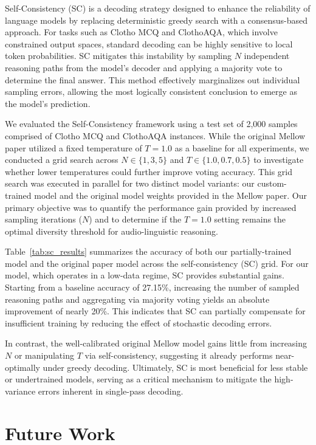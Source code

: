 \documentclass[cameraready]{Interspeech}
\begin{document}
Self-Consistency (SC) is a decoding strategy designed to enhance the reliability of language models by replacing deterministic greedy search with a consensus-based approach. For tasks such as Clotho MCQ and ClothoAQA, which involve constrained output spaces, standard decoding can be highly sensitive to local token probabilities. SC mitigates this instability by sampling $N$ independent reasoning paths from the model's decoder and applying a majority vote to determine the final answer. This method effectively marginalizes out individual sampling errors, allowing the most logically consistent conclusion to emerge as the model's prediction.

We evaluated the Self-Consistency framework using a test set of 2,000 samples comprised of Clotho MCQ and ClothoAQA instances. While the original Mellow paper utilized a fixed temperature of $T=1.0$ as a baseline for all experiments, we conducted a grid search across $N \in \{1, 3, 5\}$ and $T \in \{1.0, 0.7, 0.5\}$ to investigate whether lower temperatures could further improve voting accuracy. This grid search was executed in parallel for two distinct model variants: our custom-trained model and the original model weights provided in the Mellow paper. Our primary objective was to quantify the performance gain provided by increased sampling iterations ($N$) and to determine if the $T=1.0$ setting remains the optimal diversity threshold for audio-linguistic reasoning.

Table~\ref{tab:sc_results} summarizes the accuracy of both our partially-trained model and the original paper model across the self-consistency (SC) grid.
For our model, which operates in a low-data regime, SC provides substantial gains. Starting from a baseline accuracy of 27.15\%, increasing the number of sampled reasoning paths and aggregating via majority voting yields an absolute improvement of nearly 20\%. This indicates that SC can partially compensate for insufficient training by reducing the effect of stochastic decoding errors.

In contrast, the well-calibrated original Mellow model gains little from increasing $N$ or manipulating $T$ via self-consistency, suggesting it already performs near-optimally under greedy decoding. Ultimately, SC is most beneficial for less stable or undertrained models, serving as a critical mechanism to mitigate the high-variance errors inherent in single-pass decoding.

\section{Future Work}
\label{sec:future}
\end{document}
